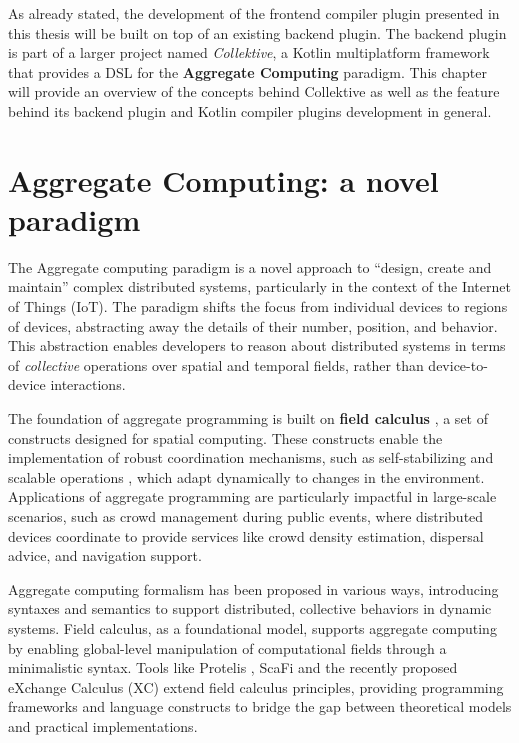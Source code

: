 \documentclass[12pt,a4paper,openright,twoside]{book}
\begin{document}
As already stated, the development of the frontend compiler plugin presented in
this thesis will be built on top of an existing backend plugin. The backend
plugin is part of a larger project named \emph{Collektive}, a Kotlin
multiplatform framework that provides a \ac{DSL} for the \textbf{Aggregate
Computing} \cite{Beal2015} paradigm. This chapter will provide an overview of
the concepts behind Collektive as well as the feature behind its backend plugin
and Kotlin compiler plugins development in general.

\section{Aggregate Computing: a novel paradigm}

The Aggregate computing paradigm is a novel approach to ``design, create and
maintain'' \cite{Beal2015} complex distributed systems, particularly in the 
context of the Internet of Things (IoT). The paradigm shifts the focus from
individual devices to regions of devices, abstracting away the details of their
number, position, and behavior. This abstraction enables developers to reason
about distributed systems in terms of \emph{collective} operations over spatial and
temporal fields, rather than device-to-device interactions. 

The foundation of aggregate programming is built on \textbf{field calculus}
\cite{Beal2014TowardsAU}, a set of constructs designed for spatial computing.
These constructs enable the implementation of robust coordination mechanisms,
such as self-stabilizing and scalable operations \cite{Viroli2018}
\cite{DBLP:journals/jlap/ViroliBDACP19}, which adapt dynamically to changes in
the environment. Applications of aggregate programming are particularly
impactful in large-scale scenarios, such as crowd management during public
events, where distributed devices coordinate to provide services like crowd
density estimation, dispersal advice, and navigation support.

Aggregate computing formalism has been proposed in various ways, introducing
syntaxes and semantics to support distributed, collective behaviors in dynamic
systems. Field calculus, as a foundational model, supports aggregate computing
by enabling global-level manipulation of computational fields through a
minimalistic syntax. 
%
Tools like Protelis \cite{DBLP:conf/saso/PianiniBV17}, ScaFi
\cite{DBLP:conf/ecoop/CasadeiV16} and the recently proposed eXchange Calculus
(XC) \cite{DBLP:journals/jss/AudritoCDSV24} extend field calculus principles,
providing programming frameworks and language constructs to bridge the gap
between theoretical models and practical implementations.
\end{document}
